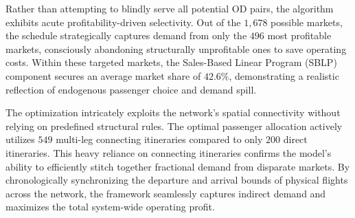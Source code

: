 Rather than attempting to blindly serve all potential OD pairs, the algorithm exhibits acute profitability-driven selectivity. Out of the $1,678$ possible markets, the schedule strategically captures demand from only the $496$ most profitable markets, consciously abandoning structurally unprofitable ones to save operating costs. Within these targeted markets, the Sales-Based Linear Program (SBLP) component secures an average market share of $42.6\%$, demonstrating a realistic reflection of endogenous passenger choice and demand spill.

The optimization intricately exploits the network's spatial connectivity without relying on predefined structural rules. The optimal passenger allocation actively utilizes $549$ multi-leg connecting itineraries compared to only $200$ direct itineraries. This heavy reliance on connecting itineraries confirms the model's ability to efficiently stitch together fractional demand from disparate markets. By chronologically synchronizing the departure and arrival bounds of physical flights across the network, the \algoNotation framework seamlessly captures indirect demand and maximizes the total system-wide operating profit.